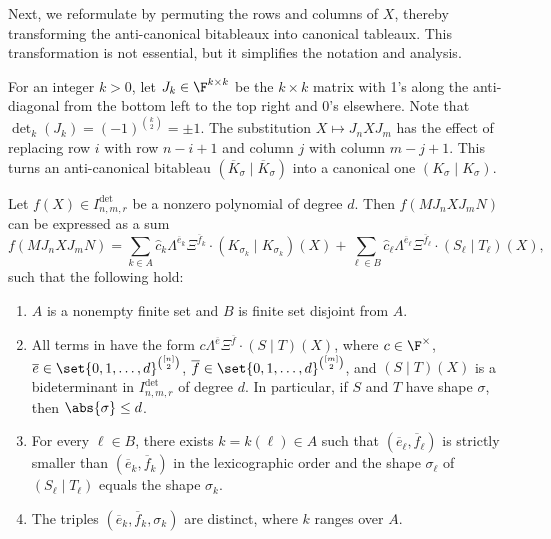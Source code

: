 \documentclass[letterpaper, 11pt]{amsart}
\begin{document}
Next, we reformulate  by permuting the rows and columns of $X$, thereby transforming the anti-canonical bitableaux into canonical tableaux.
This transformation is not essential, but it simplifies the notation and analysis.

For an integer $k>0$, let $J_{k}\in\F^{k\times k}$ be the $k\times k$ matrix with 1’s along the anti-diagonal from the bottom left to the top right and 0’s elsewhere.
Note that $\det_{k}(J_k) = (-1)^{\binom{k}{2}} = \pm 1$.
The substitution $X\mapsto J_{n} X J_{m}$ has the effect of replacing row $i$ with row $n-i+1$ and column $j$ with column $m-j+1$.
This turns an anti-canonical bitableau $(\overline{K}_\sigma\mid \overline{K}_\sigma)$ into a canonical one $(K_\sigma\mid K_\sigma)$.
\begin{cor}\label{cor:reformuated}
    Let $f(X) \in I^{\det}_{n, m, r}$ 
    be a nonzero polynomial of degree $d$.
    Then $f(M J_n X J_m N)$ can be expressed as a sum
    \begin{equation}\label{eq:expansion3}
            f(M J_n X J_m N) = \sum_{k \in A} \widehat{c}_{k} \Lambda^{\overline{e}_k}\Xi^{\overline{f}_k}\cdot (K_{\sigma_k}\mid K_{\sigma_k})(X) + \sum_{\ell \in B} \widehat{c}_{\ell} \Lambda^{\overline{e}_\ell}\Xi^{\overline{f}_\ell}\cdot (S_\ell\mid T_\ell)(X),
        \end{equation}
    such that the following hold:
    \begin{enumerate}
        \item\label{item:expansion3_i0} $A$ is a nonempty finite set and $B$ is finite set disjoint from $A$.
        \item\label{item:expansion3_i1} All terms in  have the form $c \Lambda^{\overline{e}}\Xi^{\overline{f}}\cdot (S\mid T)(X)$, where $c\in \F^\times$, $\overline{e}\in \set{0,1,\dots,d }^{\binom{[n]}{2}}$, $\overline{f}\in \set{0,1,\dots,d}^{\binom{[m]}{2}}$,
        and $(S\mid T)(X)$ is a bideterminant in $I^{\det}_{n, m, r}$ of degree $d$.
        In particular, if $S$ and $T$ have shape $\sigma$, then $\abs{\sigma} \leq d$.
        \item\label{item:expansion3_i1.5} For every $\ell\in B$, there exists $k=k(\ell)\in A$ such that $(\overline{e}_\ell, \overline{f}_\ell)$ is strictly smaller than $(\overline{e}_k,\overline{f}_k)$ in the lexicographic order and the shape $\sigma_\ell$ of $(S_\ell\mid T_\ell)$ equals the shape $\sigma_k$.
        \item\label{item:expansion3_i2} The triples $(\overline{e}_k,\overline{f}_k,\sigma_k)$ are distinct, where $k$ ranges over $A$.
    \end{enumerate} 
\end{cor}
\end{document}
